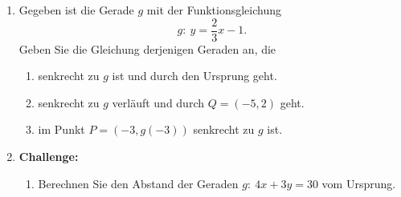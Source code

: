 \begin{ueb}
\begin{enumerate}






        \item Gegeben ist die Gerade \(g\) mit der Funktionsgleichung
              \[
                  g:\ y=\frac{2}{3}x-1.
              \]
              Geben Sie die Gleichung derjenigen Geraden an, die

              \begin{enumerate}
                  \item senkrecht zu \(g\) ist und durch den Ursprung geht.

                  \item senkrecht zu \(g\) verläuft und durch
                        \(Q=(-5, 2)\) geht.

                  \item im Punkt \(P=(-3, g(-3))\) senkrecht zu \(g\) ist.
              \end{enumerate}

        \item \textbf{Challenge:}
              \begin{enumerate}
                  \item Berechnen Sie den Abstand der Geraden
                        \(g:\ 4x+3y=30\) vom Ursprung.


\end{enumerate}
\end{enumerate}
\end{ueb}
